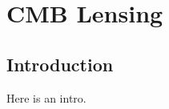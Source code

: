  
\chapter{CMB Lensing}
\renewcommand*\thesection{\arabic{section}}

\def\nnu{N_{\mathrm eff}}
\def\gtrsim{\raise-.75ex\hbox{$\buildrel>\over\sim$}}

\section{Introduction}

Here is an intro.

%



